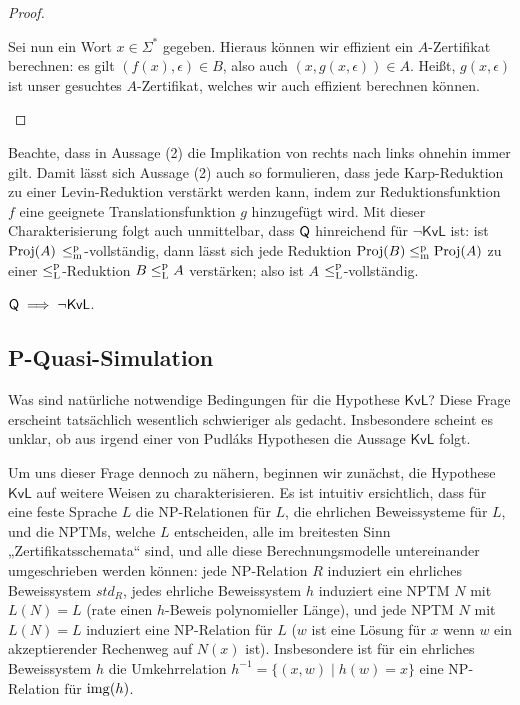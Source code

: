 \begin{proof}
\begin{prooflist}
    Sei nun ein Wort $x\in\Sigma^*$ gegeben. Hieraus können wir effizient ein $A$-Zertifikat berechnen: es gilt $(f(x),\epsilon)\in B$, also auch $(x, g(x, \epsilon))\in A$. Heißt, $g(x, \epsilon)$ ist unser gesuchtes $A$-Zertifikat, welches wir auch effizient berechnen können.
\end{prooflist}
\end{proof}

Beachte, dass in Aussage (2) die Implikation von rechts nach links ohnehin immer gilt. 
Damit lässt sich Aussage (2) auch so formulieren, dass jede Karp-Reduktion zu einer Levin-Reduktion verstärkt werden kann, indem zur Reduktionsfunktion $f$ eine geeignete Translationsfunktion $g$ hinzugefügt wird.
Mit dieser Charakterisierung folgt auch unmittelbar, dass $\mathsf{Q}$ hinreichend für $\neg\mathsf{KvL}$ ist: ist $\operatorname{Proj}(A)$ $\leq_\mathrm{m}^\mathrm{p}$-vollständig, dann lässt sich jede Reduktion $\operatorname{Proj}(B)\leq_\mathrm{m}^\mathrm{p} \operatorname{Proj}(A)$ zu einer $\leq_\mathrm{L}^\mathrm{p}$-Reduktion $B\leq_\mathrm{L}^\mathrm{p} A$ verstärken; also ist $A$ $\leq_\mathrm{L}^\mathrm{p}$-vollständig.


\begin{corollary}\label{cor:kvl-implies-q}
    $\mathsf{Q}\implies \neg\mathsf{KvL}$.
\end{corollary}

\subsection*{P-Quasi-Simulation}

Was sind natürliche notwendige Bedingungen für die Hypothese $\mathsf{KvL}$? Diese Frage erscheint tatsächlich wesentlich schwieriger als gedacht. Insbesondere scheint es unklar, ob aus irgend einer von Pudláks Hypothesen die Aussage $\mathsf{KvL}$ folgt.

Um uns dieser Frage dennoch zu nähern, beginnen wir zunächst, die Hypothese $\mathsf{KvL}$ auf weitere Weisen zu charakterisieren. Es ist intuitiv ersichtlich, dass für eine feste Sprache $L$ die NP-Relationen für $L$, die ehrlichen Beweissysteme für $L$, und die NPTMs, welche $L$ entscheiden, alle im breitesten Sinn „Zertifikatsschemata“ sind, und alle diese Berechnungsmodelle untereinander umgeschrieben werden können: jede NP-Relation $R$ induziert ein ehrliches Beweissystem $\mathit{std}_R$, jedes ehrliche Beweissystem $h$ induziert eine NPTM $N$ mit $L(N)=L$ (rate einen $h$-Beweis polynomieller Länge), und jede NPTM $N$ mit $L(N)=L$ induziert eine NP-Relation für $L$ ($w$ ist eine Lösung für $x$ wenn $w$ ein akzeptierender Rechenweg auf $N(x)$ ist). Insbesondere ist für ein ehrliches Beweissystem $h$ die Umkehrrelation $h^{-1}=\{(x,w) \mid h(w)=x \} $ eine NP-Relation für $\operatorname{img}(h)$.

